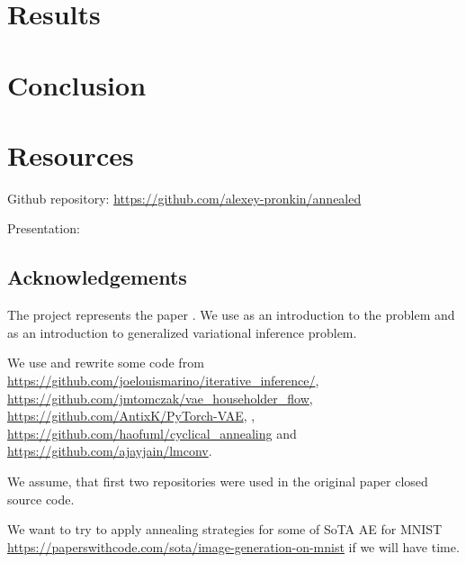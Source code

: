 \documentclass[10pt,letterpaper]{article}
\begin{document}
\section{Results}

\section{Conclusion}


\section{Resources}

Github repository:
\url{https://github.com/alexey-pronkin/annealed}

Presentation:


\subsection*{Acknowledgements}

The project represents the paper \cite{main_Huang2018ImprovingEI}.
We use \cite{lucas2019understanding} as an introduction to the problem and \cite{Knoblauch2019GeneralizedVI} as an introduction to generalized variational inference problem. 

We use and rewrite some code from \url{https://github.com/joelouismarino/iterative_inference/}, \url{https://github.com/jmtomczak/vae_householder_flow}, \url{https://github.com/AntixK/PyTorch-VAE}, , \url{https://github.com/haofuml/cyclical_annealing} and \url{https://github.com/ajayjain/lmconv}. 

We assume, that first two repositories were used in the original paper \cite{main_Huang2018ImprovingEI} closed source code. 

We want to try to apply annealing strategies for some of SoTA AE for MNIST \url{https://paperswithcode.com/sota/image-generation-on-mnist} if we will have time.



\end{document}
